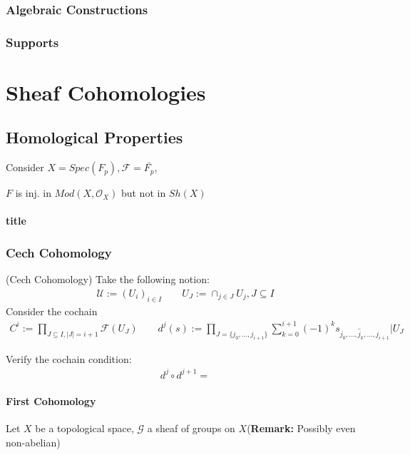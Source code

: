 \documentclass[Total.tex]{subfiles}
\begin{document}
			\subsection{Algebraic Constructions}
			
			\subsection{Supports}
		\chapter{Sheaf Cohomologies}
			\section{Homological Properties}
				\begin{example}
					Consider $X=Spec(F_p),\mathcal{F}=\bar{F_p}$,
					
					$F$ is inj. in $Mod(X,\mathcal{O}_X)$ but not in $Sh(X)$
				\end{example}
				\subsubsection{title}
				\subsection{Cech Cohomology}
				\begin{Def}
					(Cech Cohomology) Take the following notion:
					\begin{gather*}
						\mathscr{U}:=(U_i)_{i\in I}\qquad U_J:=\cap_{j\in J} U_j,J\subseteq I
					\end{gather*}
					Consider the cochain
					\begin{gather*}
						C^i:=\prod_{J\subseteq I,|J|=i+1} \mathcal{F}(U_J)\qquad d^j(s):=\prod_{J=\{j_0,\dots,j_{i+1}\}} \sum_{k=0}^{i+1} (-1)^k  s_{j_0,\dots,\hat{j}_k,\dots,j_{i+1}}|U_J
					\end{gather*}
				\end{Def}
				Verify the cochain condition:
				\begin{gather*}
					d^{j}\circ d^{j+1}=
				\end{gather*}
				\subsubsection{First Cohomology}
					\begin{Def}
						Let $X$ be a topological space, $\mathcal{G}$ a sheaf of groups on $X$(\textbf{Remark:} Possibly even non-abelian) 
					\end{Def}
					
\end{document}
